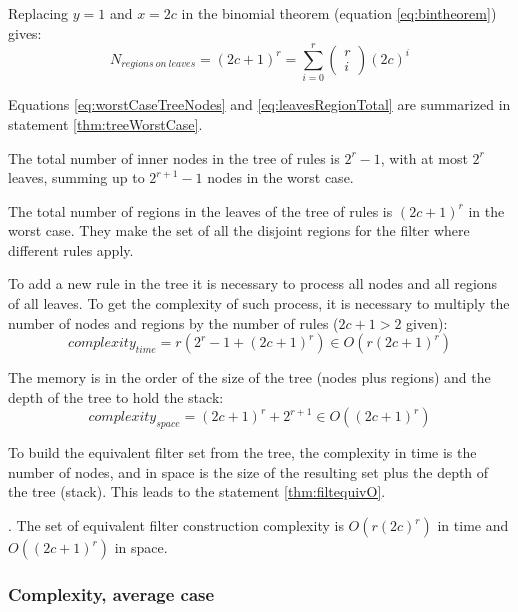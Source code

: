 Replacing $y=1$ and $x=2c$ in the binomial theorem (equation
\ref{eq:bintheorem}) gives:
\begin{equation}
	\label{eq:leavesRegionTotal}
	N_{regions\ on\ leaves} = (2c+1)^r=\sum_{i=0}^{r} \left( \begin{array}{l}r \\ i\end{array} \right) (2c)^i
\end{equation}

Equations \ref{eq:worstCaseTreeNodes} and \ref{eq:leavesRegionTotal} are summarized in
statement \ref{thm:treeWorstCase}.

\begin{mathstatement}
	\label{thm:treeWorstCase}
	The total number of inner nodes in the tree of rules is $2^r-1$, with
	at most $2^r$ leaves, summing up to $2^{r+1}-1$ nodes in the worst
	case.

	The total number of regions in the leaves of the tree of rules is $(2c+1)^r$
	in the worst case. They make the set of all the disjoint regions for the
	filter where different rules apply.
\end{mathstatement}

To add a new rule in the tree it is necessary to process all nodes and all
regions of all leaves. To get the complexity of such process, it is necessary to
multiply the number of nodes and regions by the number of rules ($2c+1>2$ given):
\begin{equation}
	complexity_{time} = r(2^r-1 + (2c+1)^r) \in O(r(2c+1)^r)
\end{equation}

The memory is in the order of the size of the tree (nodes plus regions) and the
depth of the tree to hold the stack:
\begin{equation}
	complexity_{space} = (2c+1)^r + 2^{r+1} \in O((2c+1)^r)
\end{equation}

To build the equivalent filter set from the tree, the complexity in time is the
number of nodes, and in space is the size of the resulting set plus the depth of
the tree (stack). This leads to the statement \ref{thm:filtequivO}.

\begin{mathstatement}
	\label{thm:filtequivO}.
	The set of equivalent filter construction complexity is $O(r (2c)^r)$ in
	time and $O((2c+1)^r)$ in space.
\end{mathstatement}


\subsubsection{Complexity, average case}

